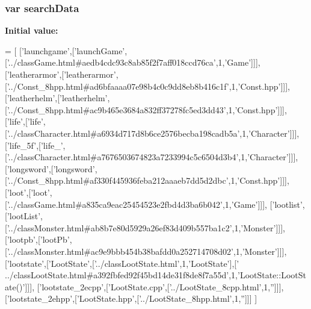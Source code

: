 \subsubsection[{search\-Data}]{\setlength{\rightskip}{0pt plus 5cm}var search\-Data}\label{all__b_8js_ad01a7523f103d6242ef9b0451861231e}
{\bfseries Initial value\-:}
\begin{DoxyCode}
=
[
  [\textcolor{stringliteral}{'launchgame'},[\textcolor{stringliteral}{'launchGame'},[\textcolor{stringliteral}{'../classGame.html#aedb4cdc93c8ab85f2f7aff018ccd76ca'},1,\textcolor{stringliteral}{'Game'}]]],
  [\textcolor{stringliteral}{'leatherarmor'},[\textcolor{stringliteral}{'leatherarmor'},[\textcolor{stringliteral}{'../Const\_8hpp.html#ad6bfaaaa07e98b4c0c9dd8eb8b416c1f'},1,\textcolor{stringliteral}{'Const.hpp'}]]],
  [\textcolor{stringliteral}{'leatherhelm'},[\textcolor{stringliteral}{'leatherhelm'},[\textcolor{stringliteral}{'../Const\_8hpp.html#ac9b465e3684a832ff37278fc5ed3dd43'},1,\textcolor{stringliteral}{'Const.hpp'}]]],
  [\textcolor{stringliteral}{'life'},[\textcolor{stringliteral}{'life'},[\textcolor{stringliteral}{'../classCharacter.html#a6934d717d8b6ce2576becba198cadb5a'},1,\textcolor{stringliteral}{'Character'}]]],
  [\textcolor{stringliteral}{'life\_5f'},[\textcolor{stringliteral}{'life\_'},[\textcolor{stringliteral}{'../classCharacter.html#a7676503674823a7233994c5c6504d3b4'},1,\textcolor{stringliteral}{'Character'}]]],
  [\textcolor{stringliteral}{'longsword'},[\textcolor{stringliteral}{'longsword'},[\textcolor{stringliteral}{'../Const\_8hpp.html#af330f445936feba212aaaeb7dd5d2dbc'},1,\textcolor{stringliteral}{'Const.hpp'}]]],
  [\textcolor{stringliteral}{'loot'},[\textcolor{stringliteral}{'loot'},[\textcolor{stringliteral}{'../classGame.html#a835ca9eac25454523e2fbd4d3ba6b042'},1,\textcolor{stringliteral}{'Game'}]]],
  [\textcolor{stringliteral}{'lootlist'},[\textcolor{stringliteral}{'lootList'},[\textcolor{stringliteral}{'../classMonster.html#ab8b7e80d5929a26ef83d409b557ba1c2'},1,\textcolor{stringliteral}{'Monster'}]]],
  [\textcolor{stringliteral}{'lootpb'},[\textcolor{stringliteral}{'lootPb'},[\textcolor{stringliteral}{'../classMonster.html#ac9e9bbb454b38bafdd0a252714708d02'},1,\textcolor{stringliteral}{'Monster'}]]],
  [\textcolor{stringliteral}{'lootstate'},[\textcolor{stringliteral}{'LootState'},[\textcolor{stringliteral}{'../classLootState.html'},1,\textcolor{stringliteral}{'LootState'}],[\textcolor{stringliteral}{'
      ../classLootState.html#a392fbfed92f45bd14de31f8de8f7a55d'},1,\textcolor{stringliteral}{'LootState::LootState()'}]]],
  [\textcolor{stringliteral}{'lootstate\_2ecpp'},[\textcolor{stringliteral}{'LootState.cpp'},[\textcolor{stringliteral}{'../LootState\_8cpp.html'},1,\textcolor{stringliteral}{''}]]],
  [\textcolor{stringliteral}{'lootstate\_2ehpp'},[\textcolor{stringliteral}{'LootState.hpp'},[\textcolor{stringliteral}{'../LootState\_8hpp.html'},1,\textcolor{stringliteral}{''}]]]
]
\end{DoxyCode}
